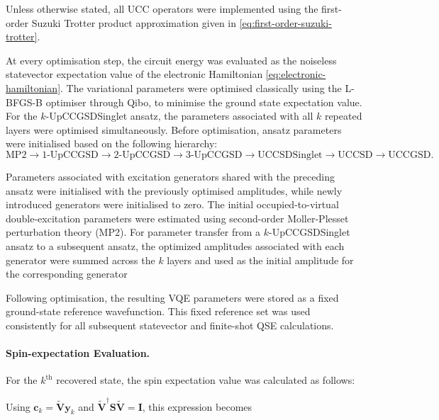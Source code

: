 Unless otherwise stated, all UCC operators were implemented using the first-order Suzuki Trotter product approximation given in \cref{eq:first-order-suzuki-trotter}. 

\SuzukiTrotterFirstOrderEquation

At every optimisation step, the circuit energy was evaluated as the noiseless statevector expectation value of the electronic Hamiltonian \cref{eq:electronic-hamiltonian}.
The variational parameters were optimised classically using the L-BFGS-B optimiser through Qibo, to minimise the ground state expectation value. For the $k$-UpCCGSDSinglet ansatz, the parameters associated with all $k$ repeated layers were optimised simultaneously.
Before optimisation, ansatz parameters were initialised based on the following hierarchy: 
\[
\mathrm{MP2}
\rightarrow
1\text{-UpCCGSD}
\rightarrow
2\text{-UpCCGSD}
\rightarrow
3\text{-UpCCGSD}
\rightarrow
\mathrm{UCCSDSinglet}
\rightarrow
\mathrm{UCCSD}
\rightarrow
\mathrm{UCCGSD}.
\]

Parameters associated with excitation generators shared with the preceding ansatz were initialised with the previously optimised amplitudes, while newly introduced generators were initialised to zero. The initial occupied-to-virtual double-excitation parameters were estimated using second-order Moller-Plesset perturbation theory (MP2). For parameter transfer from a \(k\)-UpCCGSDSinglet ansatz to a subsequent ansatz, the optimized amplitudes associated with each generator were summed across the \(k\) layers and used as the initial amplitude for the corresponding generator

Following optimisation, the resulting VQE parameters were stored as a fixed ground-state reference wavefunction. This fixed reference set was used consistently for all subsequent statevector and finite-shot QSE calculations.




\paragraph{Spin-expectation Evaluation.}

For the $k^\mathrm{th}$ recovered state, the spin expectation value was calculated as follows:

\SpinExpectationQSEBasisEquation

Using $\mathbf{c}_k=\tilde{\mathbf{V}}\mathbf{y}_k$ and
$\tilde{\mathbf{V}}^{\dagger}\mathbf{S}\tilde{\mathbf{V}}=\mathbf{I}$, this
expression becomes

\SpinExpectationShortenedBasisEquation
